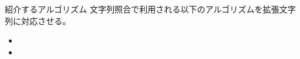 \documentclass[dvipdfmx,12pt,beamer]{standalone}
\begin{document}
\begin{frame}{紹介するアルゴリズム}
	文字列照合で利用される以下のアルゴリズムを拡張文字列に対応させる。
	\begin{itemize}
		\item \ShiftAnd
		\item \BNDM
	\end{itemize}
\end{frame}
\end{document}
